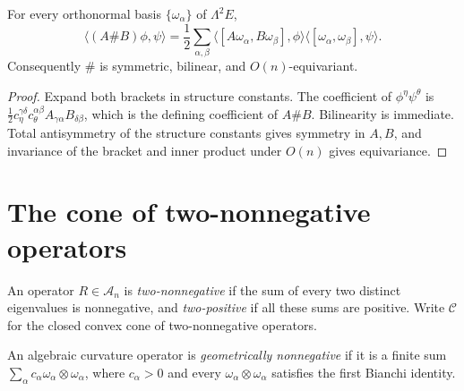 \begin{lemma}
  \label{lem:chow-ii-sharp-product-intrinsic-formula}
  For every orthonormal basis \(\{\omega_\alpha\}\) of \(\Lambda^2E\),
  \[
  \langle(A\#B)\phi,\psi\rangle
  =\frac12\sum_{\alpha,\beta}
    \langle[A\omega_\alpha,B\omega_\beta],\phi\rangle
    \langle[\omega_\alpha,\omega_\beta],\psi\rangle .
  \]
  Consequently \(\#\) is symmetric, bilinear, and \(O(n)\)-equivariant.
\end{lemma}
\begin{proof}
\sketch
  Expand both brackets in structure constants.  The coefficient of
  \(\phi^\eta\psi^\theta\) is
  \(\tfrac12c_\eta^{\gamma\delta}c_\theta^{\alpha\beta}
  A_{\gamma\alpha}B_{\delta\beta}\), which is the defining coefficient of
  \(A\#B\).  Bilinearity is immediate.  Total antisymmetry of the structure
  constants gives symmetry in \(A,B\), and invariance of the bracket and
  inner product under \(O(n)\) gives equivariance.
\end{proof}

\section{The cone of two-nonnegative operators}

\begin{definition}
  \label{def:chow-ii-two-nonnegative-algebraic-curvature}
  An operator \(R\in\mathcal A_n\) is \emph{two-nonnegative} if the sum of
  every two distinct eigenvalues is nonnegative, and \emph{two-positive} if
  all these sums are positive.  Write \(\mathcal C\) for the closed convex
  cone of two-nonnegative operators.
\end{definition}

\begin{definition}
  \label{def:chow-ii-geometrically-nonnegative-curvature}
  An algebraic curvature operator is \emph{geometrically nonnegative} if it
  is a finite sum \(\sum_\alpha c_\alpha\omega_\alpha\otimes\omega_\alpha\),
  where \(c_\alpha>0\) and every
  \(\omega_\alpha\otimes\omega_\alpha\) satisfies the first Bianchi identity.
\end{definition}

